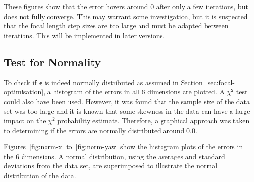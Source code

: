 These figures show that the error hovers around 0 after only a few iterations, but does not fully converge. This may warrant some investigation, but it is suspected that the focal length step sizes are too large and must be adapted between iterations. This will be implemented in later versions.

\subsection{Test for Normality}

To check if $\bm{\epsilon}$ is indeed normally distributed as assumed in Section~\ref{sec:focal-optimisation}, a histogram of the errors in all 6 dimensions are plotted. A $\chi^2$ test could also have been used. However, it was found that the sample size of the data set was too large and it is known that some skewness in the data can have a large impact on the $\chi^2$ probability estimate. Therefore, a graphical approach was taken to determining if the errors are normally distributed around 0.0. 

Figures~\ref{fig:norm-x} to~\ref{fig:norm-yaw} show the histogram plots of the errors in the 6 dimensions. A normal distribution, using the averages and standard deviations from the data set, are superimposed to illustrate the normal distribution of the data.







